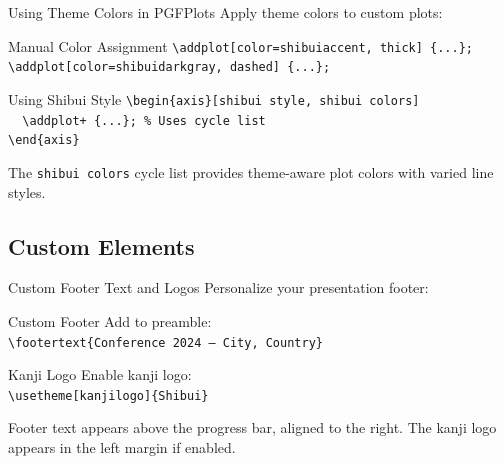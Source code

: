 \documentclass[aspectratio=169]{beamer}
\begin{document}
\begin{frame}[fragile]{Using Theme Colors in PGFPlots}
  Apply theme colors to custom plots:

  \vspace{0.5em}

  \begin{shibuiframe}{Manual Color Assignment}
    \texttt{\textbackslash addplot[color=shibuiaccent, thick] \{...\};} \\
    \texttt{\textbackslash addplot[color=shibuidarkgray, dashed] \{...\};}
  \end{shibuiframe}

  \vspace{0.3em}

  \begin{shibuiframe}{Using Shibui Style}
    \texttt{\textbackslash begin\{axis\}[shibui style, shibui colors]} \\
    \texttt{~~\textbackslash addplot+ \{...\}; \% Uses cycle list} \\
    \texttt{\textbackslash end\{axis\}}
  \end{shibuiframe}

  \vspace{0.5em}

  The \texttt{shibui colors} cycle list provides theme-aware plot colors with varied line styles.
\end{frame}

\subsection{Custom Elements}

\begin{frame}[fragile]{Custom Footer Text and Logos}
  Personalize your presentation footer:

  \vspace{0.5em}

  \begin{shibuiframe}{Custom Footer}
    Add to preamble: \\
    \texttt{\textbackslash footertext\{Conference 2024 -- City, Country\}}
  \end{shibuiframe}

  \vspace{0.5em}

  \begin{shibuiframe}{Kanji Logo}
    Enable kanji logo: \\
    \texttt{\textbackslash usetheme[kanjilogo]\{Shibui\}}
  \end{shibuiframe}

  \vspace{0.5em}

  Footer text appears above the progress bar, aligned to the right. The kanji logo appears in the left margin if enabled.
\end{frame}
\end{document}
